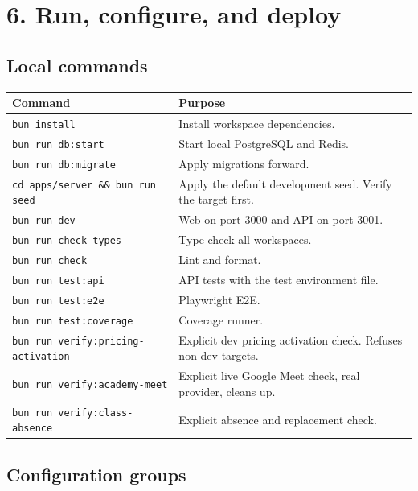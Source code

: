 \documentclass[11pt,a4paper]{article}
\newcommand{\code}[1]{\texttt{#1}}
\begin{document}
\section{6. Run, configure, and deploy}

\subsection{Local commands}

\begin{tabular}{@{}L{7.2cm}L{8.4cm}@{}}
\toprule
\textbf{Command} & \textbf{Purpose} \\
\midrule
\code{bun install} & Install workspace dependencies. \\
\code{bun run db:start} & Start local PostgreSQL and Redis. \\
\code{bun run db:migrate} & Apply migrations forward. \\
\code{cd apps/server \&\& bun run seed} & Apply the default development seed. Verify the target first. \\
\code{bun run dev} & Web on port 3000 and API on port 3001. \\
\code{bun run check-types} & Type-check all workspaces. \\
\code{bun run check} & Lint and format. \\
\code{bun run test:api} & API tests with the test environment file. \\
\code{bun run test:e2e} & Playwright E2E. \\
\code{bun run test:coverage} & Coverage runner. \\
\code{bun run verify:pricing-activation} & Explicit dev pricing activation check. Refuses non-dev targets. \\
\code{bun run verify:academy-meet} & Explicit live Google Meet check, real provider, cleans up. \\
\code{bun run verify:class-absence} & Explicit absence and replacement check. \\
\bottomrule
\end{tabular}

\subsection{Configuration groups}
\end{document}
